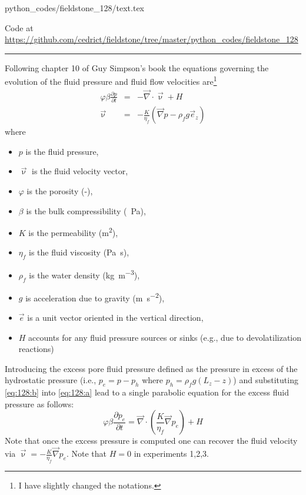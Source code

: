 \begin{flushright} {\tiny {\color{gray} python\_codes/fieldstone\_128/text.tex}} \end{flushright}



\begin{center}
\inpython
Code at \url{https://github.com/cedrict/fieldstone/tree/master/python_codes/fieldstone_128}
\end{center}

\par\noindent\rule{\textwidth}{0.4pt}


Following chapter 10 of Guy Simpson's book \cite{simp17} the equations
governing the evolution of the fluid pressure and fluid flow velocities are\footnote{I have slightly changed the notations.}
\begin{eqnarray}
\varphi \beta \frac{\partial p}{\partial t} &=& -\vec\nabla \cdot \vec \upnu + H \label{eq:128:a}\\
\vec\upnu &=& -\frac{K}{\eta_f} \left(\vec\nabla p - \rho_f g \vec{e}_z \right) \label{eq:128:b}
\end{eqnarray}
where
\begin{itemize}
\item $p$ is the fluid pressure, 
\item $\vec\upnu$ is the fluid velocity vector, 
\item $\varphi$ is the porosity (-), 
\item $\beta$ is the bulk compressibility (\si{\per\pascal}), 
\item $K$ is the permeability (\si{\square\meter}), 
\item $\eta_f$ is the fluid viscosity (\si{\pascal\second}), 
\item $\rho_f$ is the water density (\si{\kg\per\cubic\meter}), 
\item $g$ is acceleration due to gravity (\si{\meter\per\square\second}), 
\item $\vec{e}$ is a unit vector oriented in the vertical direction, 
\item $H$ accounts for any fluid pressure sources or sinks (e.g., due to devolatilization reactions)
\end{itemize}
Introducing the excess pore fluid pressure defined as the pressure in excess of the hydrostatic pressure 
(i.e., $p_e = p-p_h$ where $p_h = \rho_f g (L_z-z)$) and 
substituting \eqref{eq:128:b} into \eqref{eq:128:a} lead to a single parabolic equation for
the excess fluid pressure as follows:
\begin{equation}
\varphi \beta  \frac{\partial p_e}{\partial t}
=
\vec\nabla \cdot \left( \frac{K}{\eta_f} \vec\nabla p_e  \right) + H
\end{equation}
Note that once the excess pressure is computed one can recover the fluid velocity via 
$\vec\upnu=-\frac{K}{\eta_f} \vec\nabla p_e$. 
Note that $H=0$ in experiments 1,2,3.

